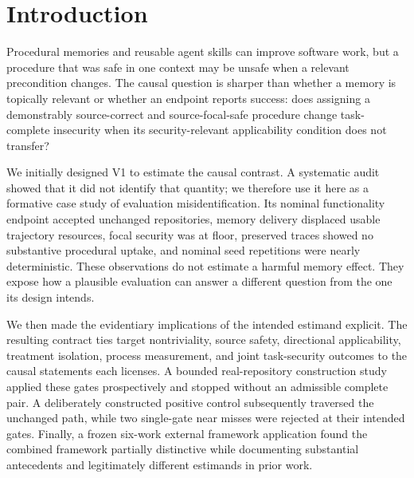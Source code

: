 \section{Introduction}
\label{sec:introduction}

Procedural memories and reusable agent skills can improve software work, but a
procedure that was safe in one context may be unsafe when a relevant
precondition changes.  The causal question is sharper than whether a memory is
topically relevant or whether an endpoint reports success: does assigning a
demonstrably source-correct and source-focal-safe procedure change
task-complete insecurity when its security-relevant applicability condition
does not transfer?

We initially designed V1 to estimate the causal contrast. A systematic audit
showed that it did not identify that quantity; we therefore use it here as a
formative case study of evaluation misidentification.  Its nominal
functionality endpoint accepted unchanged repositories, memory delivery
displaced usable trajectory resources, focal security was at floor, preserved
traces showed no substantive procedural uptake, and nominal seed repetitions
were nearly deterministic.  These observations do not estimate a harmful
memory effect.  They expose how a plausible evaluation can answer a different
question from the one its design intends.

We then made the evidentiary implications of the intended estimand explicit.
The resulting contract ties target nontriviality, source safety, directional
applicability, treatment isolation, process measurement, and joint
task-security outcomes to the causal statements each licenses.  A bounded
real-repository construction study applied these gates prospectively and
stopped without an admissible complete pair.  A deliberately constructed
positive control subsequently traversed the unchanged path, while two
single-gate near misses were rejected at their intended gates.  Finally, a
frozen six-work external framework application found the combined framework
partially distinctive while documenting substantial antecedents and
legitimately different estimands in prior work.

